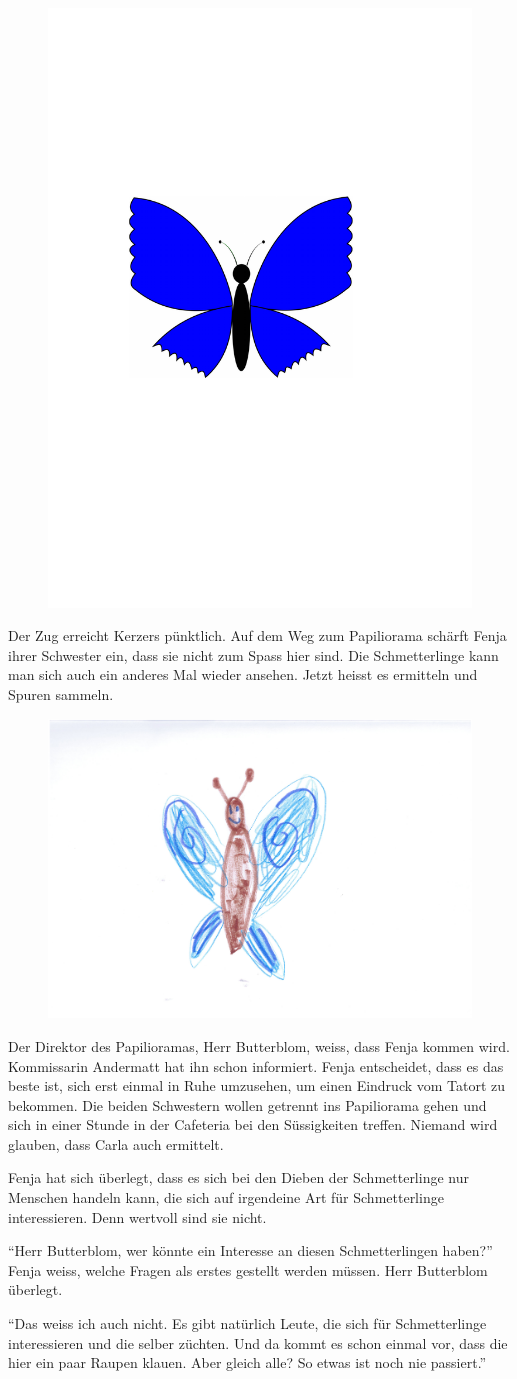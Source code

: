 \begin{figure}[H]
\centering
\includegraphics[width=.05\textwidth]{bilder/inkling.pdf}
\end{figure}

Der Zug erreicht Kerzers pünktlich. Auf dem Weg zum Papiliorama schärft Fenja ihrer Schwester ein, dass sie nicht zum Spass hier sind. Die Schmetterlinge kann man sich auch ein anderes Mal wieder ansehen. Jetzt heisst es ermitteln und Spuren sammeln.


\begin{figure}[h]
\centering
\includegraphics[width=.6\textwidth]{bilder/schmetterlingg.pdf}
\end{figure}

Der Direktor des Papilioramas, Herr Butterblom, weiss, dass Fenja kommen wird. Kommissarin Andermatt hat ihn schon informiert. Fenja entscheidet, dass es das beste ist, sich erst einmal in Ruhe umzusehen, um einen Eindruck vom Tatort zu bekommen. Die beiden Schwestern wollen getrennt ins Papiliorama gehen und sich in einer Stunde in der Cafeteria bei den Süssigkeiten treffen. Niemand wird glauben, dass Carla auch ermittelt.

Fenja hat sich überlegt, dass es sich bei den Dieben der Schmetterlinge nur Menschen handeln kann, die sich auf irgendeine Art für Schmetterlinge interessieren. Denn wertvoll sind sie nicht.  

\enquote{Herr Butterblom, wer könnte ein Interesse an diesen Schmetterlingen haben?} Fenja weiss, welche Fragen als erstes gestellt werden müssen. Herr Butterblom überlegt.

\enquote{Das weiss ich auch nicht. Es gibt natürlich Leute, die sich für Schmetterlinge interessieren und die selber züchten. Und da kommt es schon einmal vor, dass die hier ein paar Raupen klauen. Aber gleich alle? So etwas ist noch nie passiert.} 

